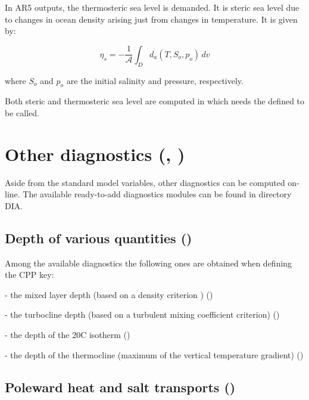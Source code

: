 \documentclass[../tex_main/NEMO_manual]{subfiles}
\begin{document}
In AR5 outputs, the thermosteric sea level is demanded.
It is steric sea level due to changes in ocean density arising just from changes in temperature.
It is given by:

\[	\eta_s = - \frac{1}{\mathcal{A}} \int_D d_a(T,S_o,p_o) \,dv
 \label{eq:thermosteric_Bq} \]

where $S_o$ and $p_o$ are the initial salinity and pressure, respectively.

Both steric and thermosteric sea level are computed in  which needs
the  defined to be called.

\section{Other diagnostics (\protect{}, \protect{})}
\label{sec:DIA_diag_others}

Aside from the standard model variables, other diagnostics can be computed on-line.
The available ready-to-add diagnostics modules can be found in directory DIA.

\subsection{Depth of various quantities (\protect{})}

Among the available diagnostics the following ones are obtained when defining the  CPP key: 

- the mixed layer depth (based on a density criterion \citep{de_Boyer_Montegut_al_JGR04}) ()

- the turbocline depth (based on a turbulent mixing coefficient criterion) ()

- the depth of the 20\deg C isotherm ()

- the depth of the thermocline (maximum of the vertical temperature gradient) ()


\subsection{Poleward heat and salt transports (\protect{})}
\end{document}

